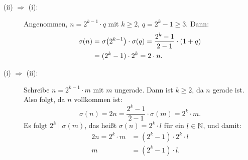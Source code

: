	\begin{beweis}
		\begin{description}
			\item[(ii) $\Rightarrow$ (i):] Angenommen, $n = 2^{k-1} \cdot q$ mit $k \geq 2$, $q = 2^k-1 \geq 3$.
			Dann:
			\begin{align*}
				\sigma(n) &= \sigma \enb{2^{k-1}} \cdot \sigma(q) = \frac{2^k-1}{2-1} \cdot (1+q) \\
				&= (2^k-1) \cdot 2^k = 2 \cdot n.
			\end{align*}  
			\item[(i) $\Rightarrow$ (ii):] Schreibe $n = 2^{k-1} \cdot m$ mit $m$ ungerade.
			Dann ist $k \geq 2$, da $n$ gerade ist.
			Also folgt, da $n$ vollkommen ist:
			\[
				\sigma(n) = 2n = \frac{2^k-1}{2-1} \cdot \sigma(m) = 2^k \cdot m.
			\] 
			Es folgt $2^k \mid \sigma(m)$, das heißt $\sigma(n) = 2^k \cdot l$ für ein $l \in \mathbb{N}$, und damit:
			\begin{align*}
				2n = 2^k \cdot m &= (2^k - 1) \cdot 2^k \cdot l \\
				m &= (2^k - 1) \cdot l.
			\end{align*}
		\end{description}
	\end{beweis}
\cleardoubleoddemptypage